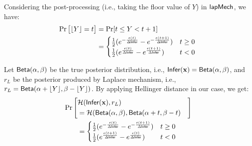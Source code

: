 \documentclass{article}
\begin{document}
Considering the post-processing (i.e., taking the floor value of $Y$) in $\mathsf{lapMech}$, we have:
\begin{align*}
\Pr\big[\lfloor Y \rfloor = t\big]&= \Pr[ t \leq Y < t + 1]\\
&= 
\begin{cases}
\frac{1}{2} (e^{- \frac{\epsilon (t)}{\Delta \mathsf{Infer}}} - e^{- \frac{\epsilon (t + 1)}{\Delta \mathsf{Infer}}}) &  t \geq 0\\
\frac{1}{2} (e^{\frac{\epsilon (t)}{\Delta \mathsf{Infer}}} - e^{\frac{\epsilon (t + 1)}{\Delta \mathsf{Infer}}}) & t < 0
\end{cases}
\end{align*}

Let $\mathsf{Beta}(\alpha, \beta)$ be the true posterior distribution, i.e., $\mathsf{Infer}(\textbf{x}) = \mathsf{Beta}(\alpha, \beta)$, and $r_L$ be the posterior produced by Laplace mechanism, i.e., $r_L = \mathsf{Beta}(\alpha + \lfloor Y \rfloor, \beta - \lfloor Y \rfloor)$. By applying Hellinger distance in our case, we get:
\begin{align*}
&
\Pr\left[
\begin{aligned}
\lefteqn{\hellinger(\bysinfer(\dataobs), r_L )}\\ 
&= \hellinger(\betad(\alpha, \beta), \betad(\alpha + t, \beta - t)
\end{aligned}
\right]
\\
&\qquad = 
\begin{cases}
\frac{1}{2} (e^{- \frac{\epsilon (t)}{\Delta \bysinfer}} - e^{- \frac{\epsilon (t + 1)}{\Delta \bysinfer}}) &  t \geq 0\\
\frac{1}{2} (e^{\frac{\epsilon (t + 1)}{\Delta \bysinfer}} - e^{\frac{\epsilon (t)}{\Delta \bysinfer}}) & t < 0
\end{cases}
\end{align*}
\end{document}
